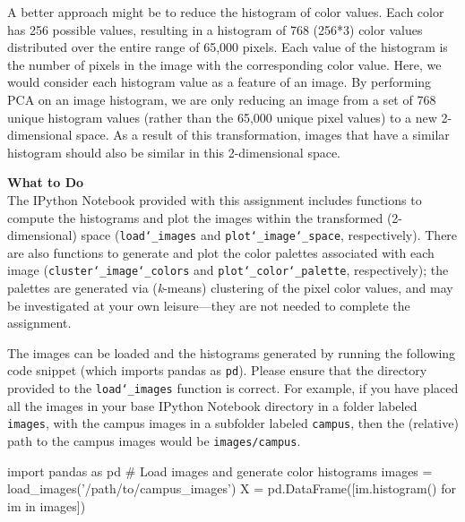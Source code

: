 \documentclass[paper=a4, fontsize=11pt]{scrartcl} %
\numberwithin{equation}{section} %
\numberwithin{figure}{section} %
\numberwithin{table}{section} %
\begin{document}
\vspace{6pt}

A better approach might be to reduce the histogram of color values. Each color has 256 possible values, resulting in a histogram of 768 (256*3) color values distributed over the entire range of 65,000 pixels. Each value of the histogram is the number of pixels in the image with the corresponding color value. Here, we would consider each histogram value as a feature of an image. By performing PCA on an image histogram, we are only reducing an image from a set of 768 unique histogram values (rather than the 65,000 unique pixel values) to a new 2-dimensional space. As a result of this transformation, images that have a similar histogram should also be similar in this 2-dimensional space.

\vspace{8pt}

\textbf{What to Do}\\
The IPython Notebook provided with this assignment includes functions to compute the histograms and plot the images within the transformed (2-dimensional) space (\texttt{load\char`_images} and \texttt{plot\char`_image\char`_space}, respectively). There are also functions to generate and plot the color palettes associated with each image (\texttt{cluster\char`_image\char`_colors} and \texttt{plot\char`_color\char`_palette}, respectively); the palettes are generated via (\textit{k}-means) clustering of the pixel color values, and may be investigated at your own leisure---they are not needed to complete the assignment.

\vspace{6pt}

The images can be loaded and the histograms generated by running the following code snippet (which imports pandas as \texttt{pd}). Please ensure that the directory provided to the \texttt{load\char`_images} function is correct. For example, if you have placed all the images in your base IPython Notebook directory in a folder labeled \texttt{images}, with the campus images in a subfolder labeled \texttt{campus}, then the (relative) path to the campus images would be \texttt{images/campus}.

\vspace{6pt}

\begin{adjustbox}{minipage=0.8\textwidth,margin=0pt \smallskipamount,center}
\begin{python}
import pandas as pd
# Load images and generate color histograms
images = load_images('/path/to/campus_images')
X = pd.DataFrame([im.histogram() for im in images])
\end{python}
\end{adjustbox}
\end{document}
